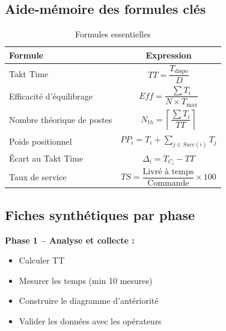 \documentclass[12pt,a4paper]{article}
\begin{document}
\begin{center}
\begin{center}
\end{center}

\subsection{Aide-mémoire des formules clés}

\begin{table}[H]
\centering
\begin{tabular}{|l|c|}
\hline
\textbf{Formule} & \textbf{Expression} \\ \hline
Takt Time & \(TT = \dfrac{T_{\text{dispo}}}{D}\) \\
Efficacité d’équilibrage & \(Eff = \dfrac{\sum T_i}{N \times T_{\text{max}}}\) \\
Nombre théorique de postes & \(N_{th} = \left\lceil \dfrac{\sum T_i}{TT} \right\rceil\) \\
Poids positionnel & \(PP_i = T_i + \sum_{j \in Succ(i)} T_j\) \\
Écart au Takt Time & \(\Delta_i = T_{C_i} - TT\) \\
Taux de service & \(TS = \dfrac{\text{Livré à temps}}{\text{Commande}} \times 100\) \\
\hline
\end{tabular}
\caption{Formules essentielles}
\label{tab:formules}
\end{table}

\subsection{Fiches synthétiques par phase}

\textbf{Phase 1 – Analyse et collecte :}
\begin{itemize}
    \item Calculer TT
    \item Mesurer les temps (min 10 mesures)
    \item Construire le diagramme d’antériorité
    \item Valider les données avec les opérateurs
\end{itemize}


\end{center}
\end{document}
